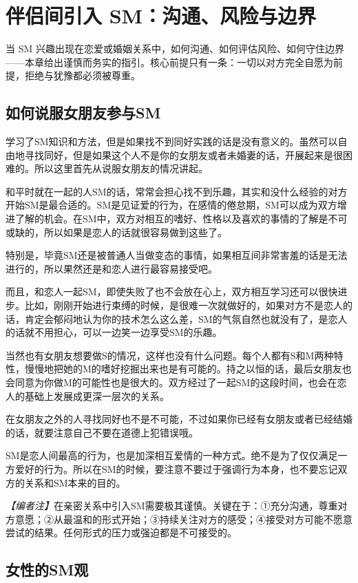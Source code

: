 \documentclass[12pt,UTF8]{ctexbook}
\begin{document}
\chapter{伴侣间引入 SM：沟通、风险与边界}

当 SM 兴趣出现在恋爱或婚姻关系中，如何沟通、如何评估风险、如何守住边界——本章给出谨慎而务实的指引。核心前提只有一条：一切以对方完全自愿为前提，拒绝与犹豫都必须被尊重。

\section{如何说服女朋友参与SM}

学习了SM知识和方法，但是如果找不到同好实践的话是没有意义的。虽然可以自由地寻找同好，但是如果这个人不是你的女朋友或者未婚妻的话，开展起来是很困难的。所以这里首先从说服女朋友的情况讲起。

和平时就在一起的人SM的话，常常会担心找不到乐趣，其实和没什么经验的对方开始SM是最合适的。SM是见证爱的行为，在感情的倦怠期，SM可以成为双方增进了解的机会。在SM中，双方对相互的嗜好、性格以及喜欢的事情的了解是不可或缺的，所以如果是恋人的话就很容易做到这些了。

特别是，毕竟SM还是被普通人当做变态的事情，如果相互间非常害羞的话是无法进行的，所以果然还是和恋人进行最容易接受吧。

而且，和恋人一起SM，即使失败了也不会放在心上，双方相互学习还可以很快进步。比如，刚刚开始进行束缚的时候，是很难一次就做好的，如果对方不是恋人的话，肯定会郁闷地认为你的技术怎么这么差，SM的气氛自然也就没有了，是恋人的话就不用担心，可以一边笑一边享受SM的乐趣。

当然也有女朋友想要做S的情况，这样也没有什么问题。每个人都有S和M两种特性，慢慢地把她的M的嗜好挖掘出来也是有可能的。持之以恒的话，最后女朋友也会同意为你做M的可能性也是很大的。双方经过了一起SM的这段时间，也会在恋人的基础上发展成更深一层次的关系。

在女朋友之外的人寻找同好也不是不可能，不过如果你已经有女朋友或者已经结婚的话，就要注意自己不要在道德上犯错误哦。

SM是恋人间最高的行为，也是加深相互爱情的一种方式。绝不是为了仅仅满足一方爱好的行为。所以在SM的时候，要注意不要过于强调行为本身，也不要忘记双方的关系和SM本来的目的。

\textit{【编者注】}在亲密关系中引入SM需要极其谨慎。关键在于：①充分沟通，尊重对方意愿；②从最温和的形式开始；③持续关注对方的感受；④接受对方可能不愿意尝试的结果。任何形式的压力或强迫都是不可接受的。

\section{女性的SM观}
\end{document}
